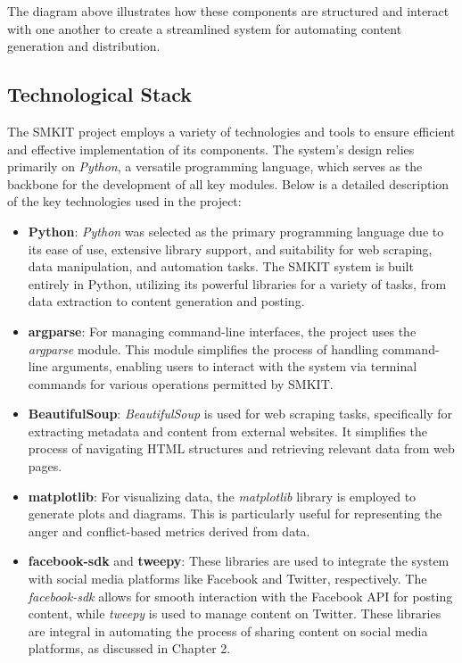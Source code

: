 The diagram above illustrates how these components are structured and interact with one another to create a streamlined system for automating content generation and distribution.

\subsection{Technological Stack}
\label{subsec:technological_stack}
The SMKIT project employs a variety of technologies and tools to ensure efficient and effective implementation of its components. The system's design relies primarily on \textit{Python}, a versatile programming language, which serves as the backbone for the development of all key modules. Below is a detailed description of the key technologies used in the project:

\begin{itemize}
    \item \textbf{Python}: \textit{Python} was selected as the primary programming language due to its ease of use, extensive library support, and suitability for web scraping, data manipulation, and automation tasks. The SMKIT system is built entirely in Python, utilizing its powerful libraries for a variety of tasks, from data extraction to content generation and posting.
    
    \item \textbf{argparse}: For managing command-line interfaces, the project uses the \textit{argparse} module. This module simplifies the process of handling command-line arguments, enabling users to interact with the system via terminal commands for various operations permitted by SMKIT.

    \item \textbf{BeautifulSoup}: \textit{BeautifulSoup} is used for web scraping tasks, specifically for extracting metadata and content from external websites. It simplifies the process of navigating HTML structures and retrieving relevant data from web pages.

    \item \textbf{matplotlib}: For visualizing data, the \textit{matplotlib} library is employed to generate plots and diagrams. This is particularly useful for representing the anger and conflict-based metrics derived from data.
    
    \item \textbf{facebook-sdk} and \textbf{tweepy}: These libraries are used to integrate the system with social media platforms like Facebook and Twitter, respectively. The \textit{facebook-sdk} allows for smooth interaction with the Facebook API for posting content, while \textit{tweepy} is used to manage content on Twitter. These libraries are integral in automating the process of sharing content on social media platforms, as discussed in Chapter 2.

\end{itemize}

